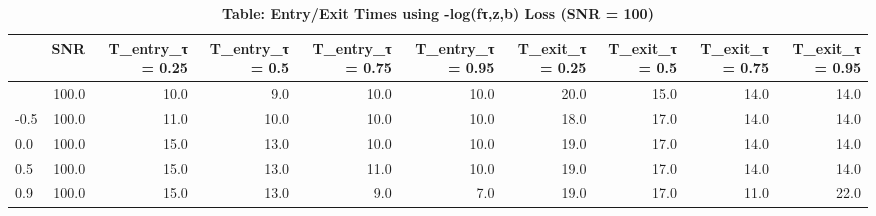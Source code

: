 \begin{table}[t]
\caption*{
{\fontsize{10}{13}\selectfont  \textbf{Table: Entry/Exit Times using -log(fτ,z,b) Loss (SNR = 100)}\small }
} 
\begin{tabular*}{\linewidth}{@{\extracolsep{\fill}}l|rrrrrrrrr}
\toprule
 & SNR & T\_entry\_τ = 0.25 & T\_entry\_τ = 0.5 & T\_entry\_τ = 0.75 & T\_entry\_τ = 0.95 & T\_exit\_τ = 0.25 & T\_exit\_τ = 0.5 & T\_exit\_τ = 0.75 & T\_exit\_τ = 0.95 \\ 
\midrule\addlinespace[2.5pt]
-0.9 & 100.0 & 10.0 & 9.0 & 10.0 & 10.0 & 20.0 & 15.0 & 14.0 & 14.0 \\ 
-0.5 & 100.0 & 11.0 & 10.0 & 10.0 & 10.0 & 18.0 & 17.0 & 14.0 & 14.0 \\ 
0.0 & 100.0 & 15.0 & 13.0 & 10.0 & 10.0 & 19.0 & 17.0 & 14.0 & 14.0 \\ 
0.5 & 100.0 & 15.0 & 13.0 & 11.0 & 10.0 & 19.0 & 17.0 & 14.0 & 14.0 \\ 
0.9 & 100.0 & 15.0 & 13.0 & 9.0 & 7.0 & 19.0 & 17.0 & 11.0 & 22.0 \\ 
\bottomrule
\end{tabular*}
\end{table}

